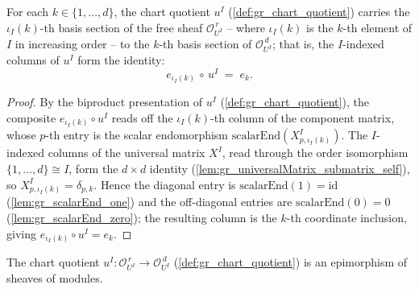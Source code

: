 \begin{lemma}
  \label{lem:gr_chartQuotientMap_iFree}
  For each \(k \in \{1,\dots,d\}\), the chart quotient \(u^I\)
  (\cref{def:gr_chart_quotient}) carries the \(\iota_I(k)\)-th basis section of the
  free sheaf \(\mathcal{O}_{U^I}^{\,r}\) -- where \(\iota_I(k)\) is the \(k\)-th
  element of \(I\) in increasing order -- to the \(k\)-th basis section of
  \(\mathcal{O}_{U^I}^{\,d}\); that is, the \(I\)-indexed columns of \(u^I\) form the
  identity:
  \[
    e_{\iota_I(k)} \,\circ\, u^I \;=\; e_k.
  \]
\end{lemma}

\begin{proof}
  By the biproduct presentation of \(u^I\) (\cref{def:gr_chart_quotient}), the
  composite \(e_{\iota_I(k)} \circ u^I\) reads off the \(\iota_I(k)\)-th column of the
  component matrix, whose \(p\)-th entry is the scalar endomorphism
  \(\mathrm{scalarEnd}(X^I_{p,\iota_I(k)})\). The \(I\)-indexed columns of the
  universal matrix \(X^I\), read through the order isomorphism \(\{1,\dots,d\} \cong
  I\), form the \(d \times d\) identity (\cref{lem:gr_universalMatrix_submatrix_self}),
  so \(X^I_{p,\iota_I(k)} = \delta_{p,k}\). Hence the diagonal entry is
  \(\mathrm{scalarEnd}(1) = \mathrm{id}\) (\cref{lem:gr_scalarEnd_one}) and the
  off-diagonal entries are \(\mathrm{scalarEnd}(0) = 0\)
  (\cref{lem:gr_scalarEnd_zero}); the resulting column is the \(k\)-th coordinate
  inclusion, giving \(e_{\iota_I(k)} \circ u^I = e_k\).
\end{proof}

\begin{lemma}
  \label{lem:gr_chartQuotientMap_epi}
  The chart quotient \(u^I : \mathcal{O}_{U^I}^{\,r} \to \mathcal{O}_{U^I}^{\,d}\)
  (\cref{def:gr_chart_quotient}) is an epimorphism of sheaves of modules.
\end{lemma}

